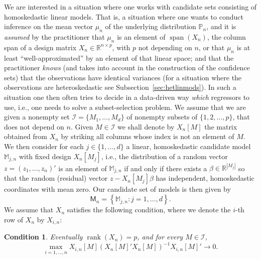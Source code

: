 \documentclass[preprint]{imsart}
\newcommand{\R}{{\mathbb R}}
\DeclareMathOperator{\rank}{rank}
\DeclareMathOperator{\s}{span}
\newtheorem{cond}{Condition}
\numberwithin{equation}{section}
\begin{document}
We are interested in a situation where one works with candidate sets consisting of homoskedastic linear models. That is, a situation where one wants to conduct  inference on the mean vector $\mu_n$ of the underlying distribution $\mathbb{P}_n$, and it is \emph{assumed} by the practitioner that $\mu_n$ is an element of  $\s(X_n)$, the column span of a design matrix $X_n \in \R^{n \times p}$, with $p$ not depending on $n$, or that $\mu_n$ is at least ``well-approximated'' by an element of that linear space; and that the practitioner \textit{knows} (and takes into account in the construction of the confidence sets) that the observations have identical variances (for a situation where the observations are heteroskedastic see Subsection~\ref{sec:hetlinmods}). In such a situation one then often tries to decide in a data-driven way \textit{which} regressors to use, i.e., one needs to solve a subset-selection problem. We assume that we are given a nonempty set $\mathcal{I} = \{M_1, \hdots, M_d\}$ of nonempty subsets of $\{1, 2, \hdots, p\}$, that does not depend on $n$. Given $M \in \mathcal{I}$ we shall denote by $X_n[M]$ the matrix obtained from $X_n$ by striking all columns whose index is not an element of $M$. We then consider for each $j \in \{1, \hdots, d\}$ a linear, homoskedastic candidate model $\mathbb{M}_{j, n}$ with fixed design $X_n[M_j]$, i.e., the distribution of a random vector $z = (z_1, \hdots, z_n)'$ is an element of $\mathbb{M}_{j, n}$ if and only if there exists a $\beta \in \R^{|M_j|}$ so that the random (residual) vector $z - X_n[M_j]\beta$ has independent, homoskedastic coordinates with mean zero.
%
Our candidate set of models is then given by
%
\begin{equation*}
\mathsf{M}_n = \left\{\mathbb{M}_{j,n}: j = 1, \hdots, d \right\}.
\end{equation*}
%
We assume that $X_n$ satisfies the following condition, where we denote the $i$-th row of $X_n$ by $X_{i,n}$:
%
\renewcommand{\thecond}{X1}
\begin{cond}\label{cond:X} 
%
Eventually $\rank(X_n) = p$, and for every $M\in\mathcal I$,
%
\begin{equation*}
\max_{i = 1, \hdots, n} X_{i,n}[M] \left( X_{n}[M]'X_{n}[M]  \right)^{-1} X_{i,n}[M]' \to 0.
\end{equation*}
%
\end{cond}
\end{document}
